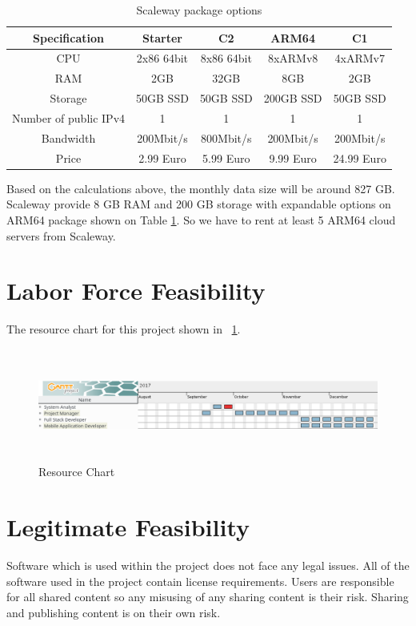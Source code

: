 \begin{table}[!ht]
\centering
\caption{Scaleway package options}
\label{scaleway}
\begin{tabular}{|c|c|c|c|c|}
\hline
\textbf{Specification}& \textbf{Starter} & \textbf{C2}  & \textbf{ARM64} & \textbf{C1} \\ \hline
CPU                             & 2x86 64bit & 8x86 64bit  & 8xARMv8 & 4xARMv7 \\ \hline
RAM                             & 2GB & 32GB & 8GB & 2GB \\ \hline
Storage                         & 50GB SSD & 50GB SSD & 200GB SSD & 50GB SSD \\ \hline
Number of public IPv4  & 1 & 1 & 1 & 1  \\ \hline
Bandwidth                       & 200Mbit/s & 800Mbit/s & 200Mbit/s & 200Mbit/s \\ \hline
Price                       & 2.99 Euro & 5.99 Euro & 9.99 Euro & 24.99 Euro \\ \hline
\end{tabular}
\end{table}

Based on the calculations above, the monthly data size will be around 827 GB. Scaleway provide 8 GB RAM and 200 GB storage with expandable options on ARM64 package shown on Table \ref{scaleway}. So we have to rent at least 5 ARM64 cloud servers from Scaleway.

\section{Labor Force Feasibility}
The resource chart for this project shown in ~\ref{fig:resource}.

\begin{figure}[!htbp]
\centering
\includegraphics[width=\textwidth, height=10em]{projectChapters/images/resource.png}
\caption{Resource Chart}
\label{fig:resource}
\end{figure}

\section{Legitimate Feasibility}
Software which is used within the project does not face any legal issues. All of the
software used in the project contain license requirements. Users are responsible for
all shared content so any misusing of any sharing content is their risk. Sharing and publishing content is on their own risk.

